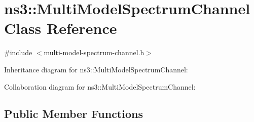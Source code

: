 \hypertarget{classns3_1_1MultiModelSpectrumChannel}{}\section{ns3\+:\+:Multi\+Model\+Spectrum\+Channel Class Reference}
\label{classns3_1_1MultiModelSpectrumChannel}


{\ttfamily \#include $<$multi-\/model-\/spectrum-\/channel.\+h$>$}



Inheritance diagram for ns3\+:\+:Multi\+Model\+Spectrum\+Channel\+:


Collaboration diagram for ns3\+:\+:Multi\+Model\+Spectrum\+Channel\+:
\subsection*{Public Member Functions}
